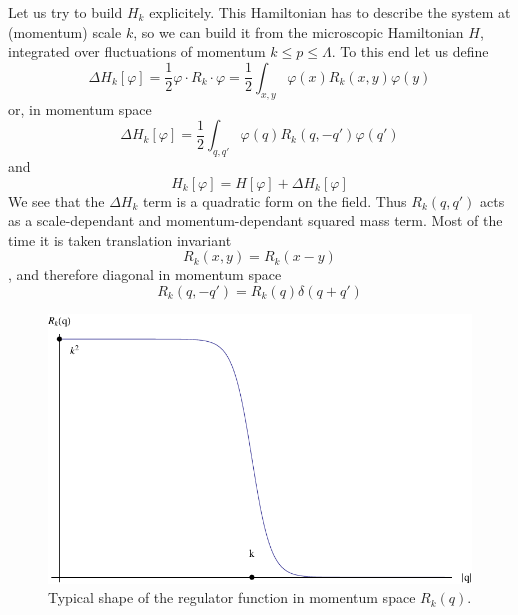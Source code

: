 Let us try to build $H_k$ explicitely. This Hamiltonian has to describe the system at (momentum) scale $k$, so we can build it from the microscopic Hamiltonian $H$, integrated over fluctuations of momentum $k \leq p \leq \Lambda$. To this end let us define 
\begin{equation}
\Delta H_k[\varphi] = \frac{1}{2} \varphi \cdot R_k \cdot \varphi = \frac{1}{2} \int_{x,y} \varphi(x) R_k(x,y) \varphi(y)
\end{equation}
or, in momentum space
\begin{equation}
\Delta H_k[\varphi] = \frac{1}{2} \int_{q,q'} \varphi(q) R_k(q,-q') \varphi(q')
\end{equation}
and
\begin{equation}
H_k[\varphi] = H[\varphi] + \Delta H_k[\varphi]
\end{equation}
We see that the $\Delta H_k$ term is a quadratic form on the field. Thus $R_k(q,q')$ acts as a scale-dependant and momentum-dependant squared mass term. Most of the time it is taken translation invariant
\begin{equation}
R_k(x,y) = R_k(x-y)
\end{equation}
, and therefore diagonal in momentum space
\begin{equation}
R_k(q,-q') = R_k(q) \delta(q+q')
\end{equation}

\begin{figure}[htp]
\begin{center}
\includegraphics[scale=1]{img/chap2/regulator.pdf}
\caption{Typical shape of the regulator function in momentum space $R_k(q)$.}
\label{fig:regulator}
\end{center}
\end{figure}

